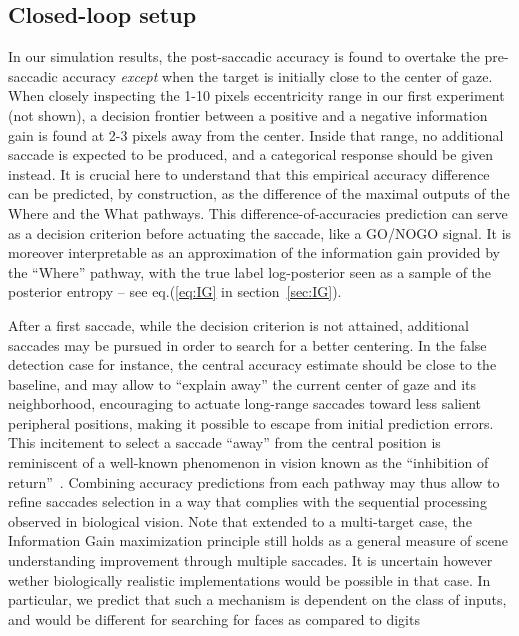 \subsection{Closed-loop setup}

In our simulation results, the post-saccadic accuracy is found to overtake the pre-saccadic accuracy \emph{except} when the target is initially close to the center of gaze. When closely inspecting the 1-10 pixels eccentricity range in our first experiment (not shown), a decision frontier between a positive and a negative information gain is found at 2-3 pixels away from the center. Inside that range, no additional saccade is expected to be produced, and a categorical response should be given instead. %
It is crucial here to understand that this empirical accuracy difference can be predicted, by construction, as the difference of the maximal outputs of the Where and the What pathways. This difference-of-accuracies prediction can serve as a decision criterion before actuating the saccade, like a GO/NOGO signal. It is moreover interpretable as an approximation of the information gain provided by the ``Where'' pathway, with the true label log-posterior seen as a sample of the posterior entropy -- see eq.(\ref{eq:IG} in section~\ref{sec:IG}).


After a first saccade, while the decision criterion is not attained, additional saccades may be pursued in order to search for a better centering.
In the false detection case for instance, the central accuracy estimate should be close to the baseline, and may allow to ``explain away'' the current center of gaze and its neighborhood, encouraging to actuate long-range saccades toward less salient peripheral positions, making it possible to escape from initial prediction errors.
This incitement to select a saccade ``away'' from the central position is reminiscent of a well-known phenomenon in vision known as the ``inhibition of return''~\cite{Itti01}.
Combining accuracy predictions from each pathway may thus allow to refine saccades selection in a way that complies with the sequential processing observed in biological vision. Note that extended to a multi-target case, the Information Gain maximization principle still holds as a general measure of scene understanding improvement through multiple saccades. It is uncertain however wether biologically realistic implementations would be possible in that case.
In particular, we predict that such a mechanism is dependent on the class of inputs, and would be different for searching for faces as compared to digits

